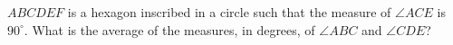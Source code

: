 $ABCDEF$ is a hexagon inscribed in a circle such that the measure of $\angle{ACE}$ is $90^{\circ}$. What is the average of the measures, in degrees, of $\angle{ABC}$ and $\angle{CDE}$?